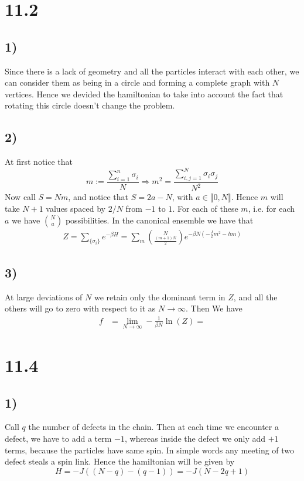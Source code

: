\documentclass[10pt,a4paper]{book}
\begin{document}
\section*{11.2}

\subsection*{1)}
Since there is a lack of geometry and all the particles interact with each other, we can consider them as being in a circle and forming a complete graph with $N$ vertices. Hence we devided the hamiltonian to take into account the fact that rotating this circle doesn't change the problem.

\subsection*{2)}
At first notice that 
$$m:=\frac{\sum_{i=1}^n\sigma_i}{N} \Rightarrow m^2=\frac{\sum_{i,j=1}^N\sigma_i\sigma_j}{N^2}$$
Now call $S=Nm$, and notice that $S=2a-N$, with $a\in\llbracket 0,N\rrbracket$. Hence $m$ will take $N+1$ values spaced by $2/N$ from $-1$ to $1$. For each of these $m$, i.e. for each $a$ we have $\binom{N}{a}$ possibilities. In the canonical ensemble we have that 
\begin{align*}
Z=\sum_{\{\sigma_i\}} e^{-\beta H}=\sum_{m} \binom{N}{\frac{(m+1)N}{2}}e^{-\beta N(-\frac{J}{2}m^2-hm)}
\end{align*}

\subsection*{3)}
At large deviations of $N$ we retain only the dominant term in $Z$, and all the others will go to zero with respect to it as $N\to\infty$. Then 
We have
\begin{align*}
f&=\lim_{N\to\infty}-\frac{1}{\beta N}\ln(Z)
=
\end{align*}










\section*{11.4}
\subsection*{1)}
Call $q$ the number of defects in the chain. Then at each time we encounter a defect, we have to add a term $-1$, whereas inside the defect we only add $+1$ terms, because the particles have same spin. In simple words any meeting of two defect steals a spin link. Hence the hamiltonian will be given by 
$$H=-J((N-q)-(q-1))=-J(N-2q+1)$$
\end{document}
